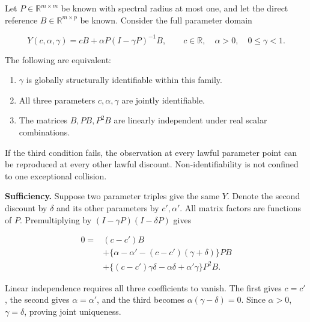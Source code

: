 \documentclass[11pt,a4paper]{article}
\providecommand{\tightlist}{\setlength{\itemsep}{0pt}\setlength{\parskip}{0pt}}
\begin{document}
\par
\noindent\begin{minipage}{\linewidth}

Let \(P\in\mathbb R^{m\times m}\) be known with spectral radius at most
one, and let the direct reference \(B\in\mathbb R^{m\times p}\) be
known. Consider the full parameter domain

\[
Y(c,\alpha,\gamma)
=cB+\alpha P(I-\gamma P)^{-1}B,
\qquad c\in\mathbb R,\quad\alpha>0,\quad0\le\gamma<1.
\]

\end{minipage}\par

The following are equivalent:

\begin{enumerate}
\def\labelenumi{\arabic{enumi}.}
\tightlist
\item
  \(\gamma\) is globally structurally identifiable within this family.
\item
  All three parameters \(c,\alpha,\gamma\) are jointly identifiable.
\item
  The matrices \(B,PB,P^2B\) are linearly independent under real scalar
  combinations.
\end{enumerate}

If the third condition fails, the observation at every lawful parameter
point can be reproduced at every other lawful discount.
Non-identifiability is not confined to one exceptional collision.

\par
\noindent\begin{minipage}{\linewidth}

\textbf{Sufficiency.} Suppose two parameter triples give the same \(Y\).
Denote the second discount by \(\delta\) and its other parameters by
\(c',\alpha'\). All matrix factors are functions of \(P\).
Premultiplying by \((I-\gamma P)(I-\delta P)\) gives

\[
\begin{aligned}
0={}&(c-c')B\\
&+\{\alpha-\alpha'-(c-c')(\gamma+\delta)\}PB\\
&+\{(c-c')\gamma\delta-\alpha\delta+\alpha'\gamma\}P^2B.
\end{aligned}
\]

\end{minipage}\par

Linear independence requires all three coefficients to vanish. The first
gives \(c=c'\), the second gives \(\alpha=\alpha'\), and the third
becomes \(\alpha(\gamma-\delta)=0\). Since \(\alpha>0\),
\(\gamma=\delta\), proving joint uniqueness.
\end{document}
